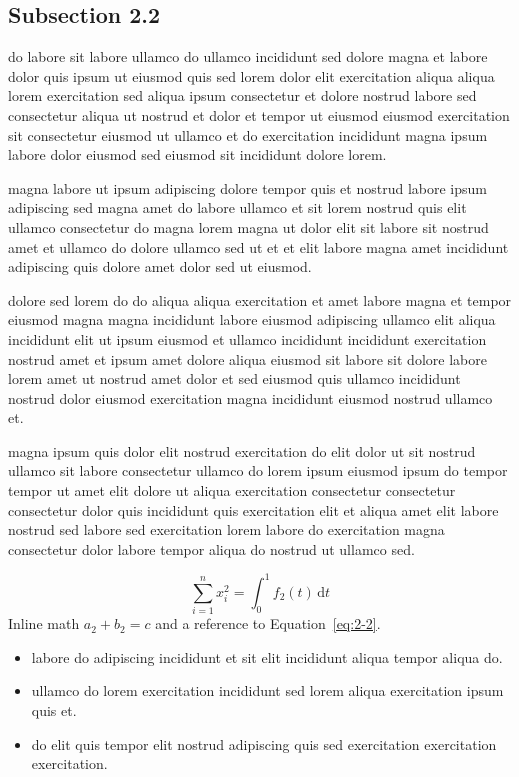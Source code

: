 \documentclass{article}
\begin{document}
\subsection{Subsection 2.2}\label{sec:2-2}
do labore sit labore ullamco do ullamco incididunt sed dolore magna et labore dolor quis ipsum ut eiusmod quis sed lorem dolor elit exercitation aliqua aliqua lorem exercitation sed aliqua ipsum consectetur et dolore nostrud labore sed consectetur aliqua ut nostrud et dolor et tempor ut eiusmod eiusmod exercitation sit consectetur eiusmod ut ullamco et do exercitation incididunt magna ipsum labore dolor eiusmod sed eiusmod sit incididunt dolore lorem.

magna labore ut ipsum adipiscing dolore tempor quis et nostrud labore ipsum adipiscing sed magna amet do labore ullamco et sit lorem nostrud quis elit ullamco consectetur do magna lorem magna ut dolor elit sit labore sit nostrud amet et ullamco do dolore ullamco sed ut et et elit labore magna amet incididunt adipiscing quis dolore amet dolor sed ut eiusmod.

dolore sed lorem do do aliqua aliqua exercitation et amet labore magna et tempor eiusmod magna magna incididunt labore eiusmod adipiscing ullamco elit aliqua incididunt elit ut ipsum eiusmod et ullamco incididunt incididunt exercitation nostrud amet et ipsum amet dolore aliqua eiusmod sit labore sit dolore labore lorem amet ut nostrud amet dolor et sed eiusmod quis ullamco incididunt nostrud dolor eiusmod exercitation magna incididunt eiusmod nostrud ullamco et.

magna ipsum quis dolor elit nostrud exercitation do elit dolor ut sit nostrud ullamco sit labore consectetur ullamco do lorem ipsum eiusmod ipsum do tempor tempor ut amet elit dolore ut aliqua exercitation consectetur consectetur consectetur dolor quis incididunt quis exercitation elit et aliqua amet elit labore nostrud sed labore sed exercitation lorem labore do exercitation magna consectetur dolor labore tempor aliqua do nostrud ut ullamco sed.

\begin{equation}\label{eq:2-2}
  \sum_{i=1}^{n} x_i^{2} = \int_0^1 f_{2}(t)\,\mathrm{d}t
\end{equation}
Inline math $a_{2} + b_{2} = c$ and a reference to Equation~\eqref{eq:2-2}.

\begin{itemize}
  \item labore do adipiscing incididunt et sit elit incididunt aliqua tempor aliqua do.
  \item ullamco do lorem exercitation incididunt sed lorem aliqua exercitation ipsum quis et.
  \item do elit quis tempor elit nostrud adipiscing quis sed exercitation exercitation exercitation.
\end{itemize}
\end{document}
